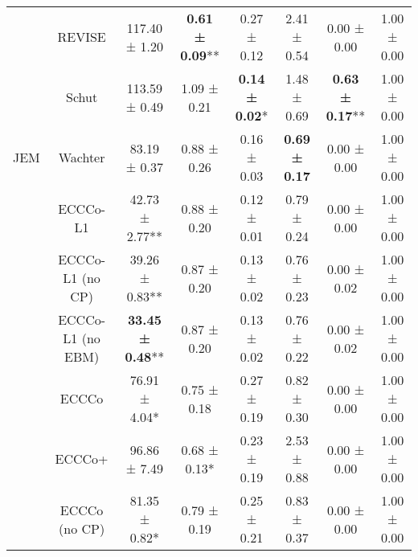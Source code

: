 \begin{table}
{\begin{tabular}[t]{cccccccc}
 & REVISE & 117.40 ± 1.20\hphantom{*}\hphantom{*} & \textbf{0.61 ± 0.09}** & 0.27 ± 0.12\hphantom{*}\hphantom{*} & 2.41 ± 0.54\hphantom{*}\hphantom{*} & 0.00 ± 0.00\hphantom{*}\hphantom{*} & 1.00 ± 0.00\hphantom{*}\hphantom{*}\\

 & Schut & 113.59 ± 0.49\hphantom{*}\hphantom{*} & 1.09 ± 0.21\hphantom{*}\hphantom{*} & \textbf{0.14 ± 0.02}*\hphantom{*} & 1.48 ± 0.69\hphantom{*}\hphantom{*} & \textbf{0.63 ± 0.17}** & 1.00 ± 0.00\hphantom{*}\hphantom{*}\\

\multirow[t]{-10}{*}{\centering\arraybackslash JEM} & Wachter & 83.19 ± 0.37\hphantom{*}\hphantom{*} & 0.88 ± 0.26\hphantom{*}\hphantom{*} & 0.16 ± 0.03\hphantom{*}\hphantom{*} & \textbf{0.69 ± 0.17}\hphantom{*}\hphantom{*} & 0.00 ± 0.00\hphantom{*}\hphantom{*} & 1.00 ± 0.00\hphantom{*}\hphantom{*}\\
\cmidrule{1-8}
 & ECCCo-L1 & 42.73 ± 2.77** & 0.88 ± 0.20\hphantom{*}\hphantom{*} & 0.12 ± 0.01\hphantom{*}\hphantom{*} & 0.79 ± 0.24\hphantom{*}\hphantom{*} & 0.00 ± 0.00\hphantom{*}\hphantom{*} & 1.00 ± 0.00\hphantom{*}\hphantom{*}\\

 & ECCCo-L1 (no CP) & 39.26 ± 0.83** & 0.87 ± 0.20\hphantom{*}\hphantom{*} & 0.13 ± 0.02\hphantom{*}\hphantom{*} & 0.76 ± 0.23\hphantom{*}\hphantom{*} & 0.00 ± 0.02\hphantom{*}\hphantom{*} & 1.00 ± 0.00\hphantom{*}\hphantom{*}\\

 & ECCCo-L1 (no EBM) & \textbf{33.45 ± 0.48}** & 0.87 ± 0.20\hphantom{*}\hphantom{*} & 0.13 ± 0.02\hphantom{*}\hphantom{*} & 0.76 ± 0.22\hphantom{*}\hphantom{*} & 0.00 ± 0.02\hphantom{*}\hphantom{*} & 1.00 ± 0.00\hphantom{*}\hphantom{*}\\

 & ECCCo & 76.91 ± 4.04*\hphantom{*} & 0.75 ± 0.18\hphantom{*}\hphantom{*} & 0.27 ± 0.19\hphantom{*}\hphantom{*} & 0.82 ± 0.30\hphantom{*}\hphantom{*} & 0.00 ± 0.00\hphantom{*}\hphantom{*} & 1.00 ± 0.00\hphantom{*}\hphantom{*}\\

 & ECCCo+ & 96.86 ± 7.49\hphantom{*}\hphantom{*} & 0.68 ± 0.13*\hphantom{*} & 0.23 ± 0.19\hphantom{*}\hphantom{*} & 2.53 ± 0.88\hphantom{*}\hphantom{*} & 0.00 ± 0.00\hphantom{*}\hphantom{*} & 1.00 ± 0.00\hphantom{*}\hphantom{*}\\

 & ECCCo (no CP) & 81.35 ± 0.82*\hphantom{*} & 0.79 ± 0.19\hphantom{*}\hphantom{*} & 0.25 ± 0.21\hphantom{*}\hphantom{*} & 0.83 ± 0.37\hphantom{*}\hphantom{*} & 0.00 ± 0.00\hphantom{*}\hphantom{*} & 1.00 ± 0.00\hphantom{*}\hphantom{*}\\


\end{tabular}}
\end{table}
